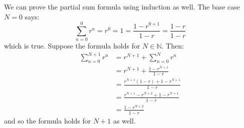 \documentclass{article}
\theoremstyle{plain}
\theoremstyle{normal}
\begin{document}
    \par\hfill\par
    We can prove the partial sum formula using induction as well. The base
    case $N=0$ says:
    \begin{equation}
        \sum_{n=0}^{0}r^{n}=r^{0}=1=\frac{1-r^{0+1}}{1-r}=\frac{1-r}{1-r}
    \end{equation}
    which is true. Suppose the formula holds for $N\in\mathbb{N}$. Then:
    \begin{align}
        \sum_{n=0}^{N+1}r^{n}
        &=r^{N+1}+\sum_{n=0}^{N}r^{n}\\
        &=r^{N+1}+\frac{1-r^{N+1}}{1-r}\\
        &=\frac{r^{N+1}(1-r)+1-r^{N+1}}{1-r}\\
        &=\frac{r^{N+1}-r^{N+2}+1-r^{N+1}}{1-r}\\
        &=\frac{1-r^{N+2}}{1-r}
    \end{align}
    and so the formula holds for $N+1$ as well.
\end{document}
